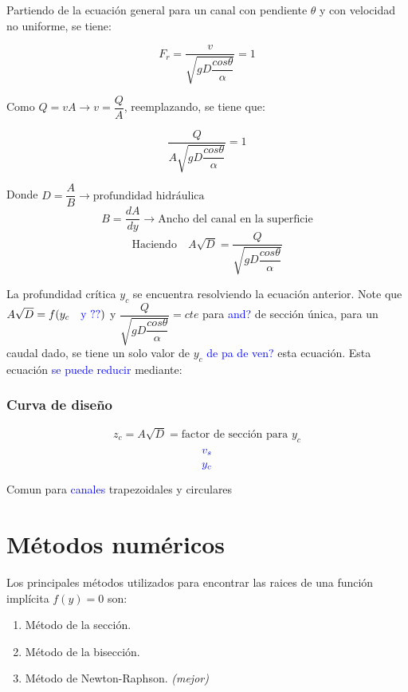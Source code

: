 \documentclass[a4paper, 11pt]{article}
\begin{document}
Partiendo de la ecuación general para un canal con pendiente $\theta$ y con velocidad no uniforme, se tiene:

\begin{equation}
    F_{r}=\dfrac{v}{\sqrt{gD\dfrac{cos\theta}{\alpha}}}=1
\end{equation}

Como  $Q=vA\rightarrow v=\dfrac{Q}{A}$, reemplazando, se tiene que:

\begin{equation}
    \dfrac{Q}{A\sqrt{gD\dfrac{cos\theta}{\alpha}}}=1
\end{equation}

Donde $D=\dfrac{A}{B}\rightarrow \text{profundidad hidráulica}$
$$B=\dfrac{dA}{dy}\rightarrow \text{Ancho del canal en la superficie}$$
$$\text{Haciendo} \quad A\sqrt{D}=\dfrac{Q}{\sqrt{gD\dfrac{cos\theta}{\alpha}}}$$

La profundidad crítica $y_c$ se encuentra resolviendo la ecuación anterior. Note que $A\sqrt{D}=f(y_c \quad \text{\textcolor{blue}{y ??}})$ y $\dfrac{Q}{\sqrt{gD\dfrac{cos\theta}{\alpha}}}=cte$ para \textcolor{blue}{and?} de sección única, para un caudal dado, se tiene un solo valor de $y_{c}$ \textcolor{blue}{de pa de ven?} esta ecuación. Esta ecuación \textcolor{blue}{se puede reducir} mediante:

\subsubsection{Curva de diseño}

$$z_{c}=A\sqrt{D}=\text{factor de sección para $y_c$}$$ 
$$\textcolor{blue}{v_{s}}$$
$$\textcolor{blue}{y_{c}}$$

Comun para \textcolor{blue}{canales} trapezoidales y circulares

\section{Métodos numéricos}

Los principales métodos utilizados para encontrar las raices de una función implícita $f(y)=0$ son:

\begin{enumerate}
    \item Método de la sección.
    \item Método de la bisección.
    \item Método de Newton-Raphson. \textit{(mejor)}
\end{enumerate}
\end{document}
